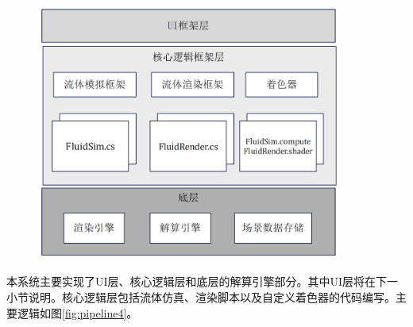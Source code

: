 \begin{figure}[ht]
    \centering
    \includegraphics[width=10cm]{image/pipeline3.png}
    \label{fig:pipeline3}
\end{figure}

本系统主要实现了UI层、核心逻辑层和底层的解算引擎部分。其中UI层将在下一小节说明。核心逻辑层包括流体仿真、渲染脚本以及自定义着色器的代码编写。主要逻辑如图\ref{fig:pipeline4}。

